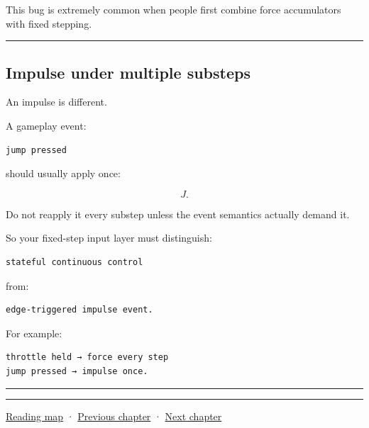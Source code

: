 This bug is extremely common when people first combine force accumulators with fixed stepping.

\begin{center}\rule{0.5\linewidth}{0.5pt}\end{center}

\subsection{Impulse under multiple substeps}\label{06-engine-ii-ch037-impulse-under-multiple-substeps}

\hypertarget{06-engine-ii-ch037-impulse-under-multiple-substeps}{}

An impulse is different.

A gameplay event:

\begin{verbatim}
jump pressed
\end{verbatim}

should usually apply once:

\[
J.
\]

Do not reapply it every substep unless the event semantics actually demand it.

So your fixed-step input layer must distinguish:

\begin{verbatim}
stateful continuous control
\end{verbatim}

from:

\begin{verbatim}
edge-triggered impulse event.
\end{verbatim}

For example:

\begin{verbatim}
throttle held → force every step
jump pressed → impulse once.
\end{verbatim}

\begin{center}\rule{0.5\linewidth}{0.5pt}\end{center}

\begin{center}\rule{0.5\linewidth}{0.5pt}\end{center}

\hyperref[volume-reading-map]{Reading map} · \hyperref[06-engine-ii-ch036-auditing-capsule-mass-properties-and-collision-formulas]{Previous chapter} · \hyperref[06-engine-ii-ch038-integrator-choices-and-energy-drift]{Next chapter}
